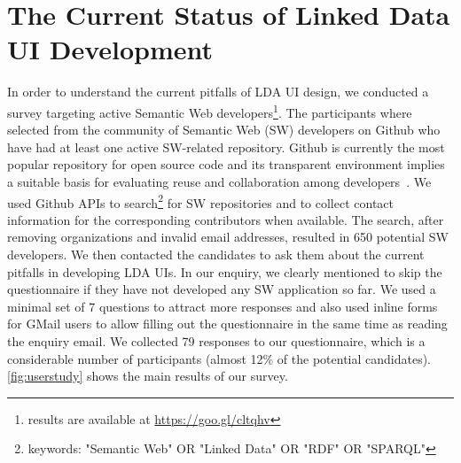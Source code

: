 \documentclass{llncs}
\begin{document}
%

\section{The Current Status of Linked Data UI Development}
In order to understand the current pitfalls of LDA UI design, we conducted a survey targeting %
active Semantic Web developers\footnote{results are available at \url{https://goo.gl/cltqhv}}.
The participants where selected from the community of Semantic Web (SW) developers on Github who have had at least one active SW-related repository.
Github is currently the most popular repository for open source code and its transparent environment implies a suitable basis for evaluating reuse and collaboration among developers~\cite{Tsay2014}.
We used Github APIs to search\footnote{keywords: "Semantic Web" OR "Linked Data" OR "RDF" OR "SPARQL"} for SW repositories and to collect contact information for the corresponding contributors when available.
The search, after removing organizations and invalid email addresses, resulted in 650 potential SW developers.
We then contacted the candidates to ask them about the current pitfalls in developing LDA UIs.
In our enquiry, we clearly mentioned to skip the questionnaire if they have not developed any SW application so far.
We used a minimal set of 7 questions to attract more responses and also used inline forms for GMail users to allow filling out the questionnaire in the same time as reading the enquiry email.
We collected 79 responses to our questionnaire, which is a considerable number of participants (almost 12\% of the potential candidates).
\autoref{fig:userstudy} shows the main results of our survey.
\vspace{-1em}
\end{document}
